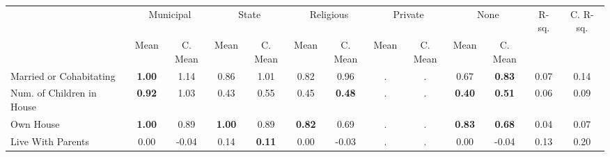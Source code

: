 \begin{tabular}{l c c c c c c c c c c c c}
\toprule
& \multicolumn{2}{c}{Municipal} & \multicolumn{2}{c}{State} & \multicolumn{2}{c}{Religious} & \multicolumn{2}{c}{Private} & \multicolumn{2}{c}{None} & R-sq. & C. R-sq. \\
& \scriptsize Mean & \scriptsize C. Mean & \scriptsize Mean & \scriptsize C. Mean & \scriptsize Mean & \scriptsize C. Mean & \scriptsize Mean & \scriptsize C. Mean & \scriptsize Mean & \scriptsize C. Mean & & \\
\midrule
Married or Cohabitating & \textbf{     1.00} & 1.14 &      0.86 & 1.01 &      0.82 & 0.96 &         . & . &      0.67 & \textbf{     0.83} &      0.07 &      0.14 \\
Num. of Children in House & \textbf{     0.92} & 1.03 &      0.43 & 0.55 &      0.45 & \textbf{     0.48} &         . & . & \textbf{     0.40} & \textbf{     0.51} &      0.06 &      0.09 \\
Own House & \textbf{     1.00} & 0.89 & \textbf{     1.00} & 0.89 & \textbf{     0.82} & 0.69 &         . & . & \textbf{     0.83} & \textbf{     0.68} &      0.04 &      0.07 \\
Live With Parents &      0.00 & -0.04 &      0.14 & \textbf{     0.11} &      0.00 & -0.03 &         . & . &      0.00 & -0.04 &      0.13 &      0.20 \\
\bottomrule
\end{tabular}
